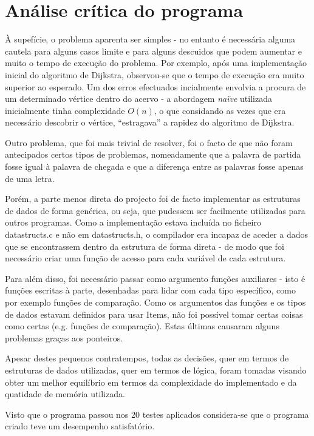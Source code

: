\documentclass[a4paper, 11pt]{article}
\begin{document}
\section{Análise crítica do programa}
    \par À supefície, o problema aparenta ser simples - no entanto é necessária alguma cautela para alguns casos limite e para alguns descuidos que podem aumentar e muito o tempo de execução do problema. Por exemplo, após uma implementação inicial do algoritmo de Dijkstra, observou-se que o tempo de execução era muito superior ao esperado. Um dos erros efectuados incialmente envolvia a procura de um determinado vértice dentro do acervo - a abordagem \textit{naïve} utilizada inicialmente tinha complexidade $O(n)$, o que considando as vezes que era necessário descobrir o vértice, ``estragava'' a rapidez do algoritmo de Dijkstra.
    \par Outro problema, que foi mais trivial de resolver, foi o facto de que não foram antecipados certos tipos de problemas, nomeadamente que a palavra de partida fosse igual à palavra de chegada e que a diferença entre as palavras fosse apenas de uma letra.
    \par Porém, a parte menos direta do projecto foi de facto implementar as estruturas de dados de forma genérica, ou seja, que pudessem ser facilmente utilizadas para outros programas. Como a implementação estava incluída no ficheiro datastructs.c e não em datastructs.h, o compilador era incapaz de aceder a dados que se encontrassem dentro da estrutura de forma direta - de modo que foi necessário criar uma função de acesso para cada variável de cada estrutura.
    \par Para além disso, foi necessário passar como argumento funções auxiliares - isto é funções escritas à parte, desenhadas para lidar com cada tipo específico, como por exemplo funções de comparação. Como os argumentos das funções e os tipos de dados estavam definidos para usar Items, não foi possível tomar certas coisas como certas (e.g. funções de comparação). Estas últimas causaram alguns problemas graças aos ponteiros.
    \par Apesar destes pequenos contratempos, todas as decisões, quer em termos de estruturas de dados utilizadas, quer em termos de lógica, foram tomadas visando obter um melhor equilíbrio em termos da complexidade do implementado e da quatidade de memória utilizada. 
	\par Visto que o programa passou nos 20 testes aplicados considera-se que o programa criado teve um desempenho satisfatório.
\end{document}

